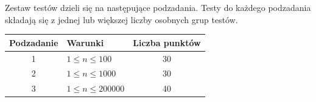\documentclass[10pt]{article}
\begin{document}
    Zestaw testów dzieli się na następujące podzadania. Testy do każdego podzadania składają się z jednej lub większej liczby osobnych grup testów.
    
    \begin{center}
        \begin{tabular}{ |c|p{9cm}|c| }
            \hline
            \textbf{Podzadanie} & \textbf{Warunki} & \textbf{Liczba punktów}\\
            \hline
            1 & $1 \leq n \leq 100$ & 30\\
            \hline
            2 & $1 \leq n \leq 1000$ & 30\\
            \hline
            3 & $1 \leq n \leq 200000$ & 40\\
            \hline
        \end{tabular}
    \end{center}
\end{document}

